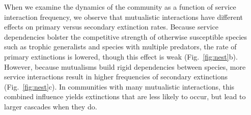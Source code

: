 \documentclass[twocolumn,preprintnumbers,amsmath,amssymb,superscriptaddress,linenumbers]{revtex4-1}
\newcommand{\rev}[1]{\textcolor{crimson}{#1}}
\begin{document}
\begin{bibunit}

When we examine the dynamics of the community as a function of service interaction frequency, we observe that mutualistic interactions have different effects on primary versus secondary extinction rates.
Because service dependencies bolster the competitive strength of otherwise susceptible species such as trophic generalists and species with multiple predators, the rate of primary extinctions is lowered, though this effect is weak (Fig.\ \ref{fig:nest}b).
However, because mutualisms build rigid dependencies between species, more service interactions result in higher frequencies of secondary extinctions (Fig.\ \ref{fig:nest}c). 
In communities with many mutualistic interactions, this combined influence yields extinctions that are less likely to occur, but lead to larger cascades when they do.


\end{bibunit}
\end{document}
